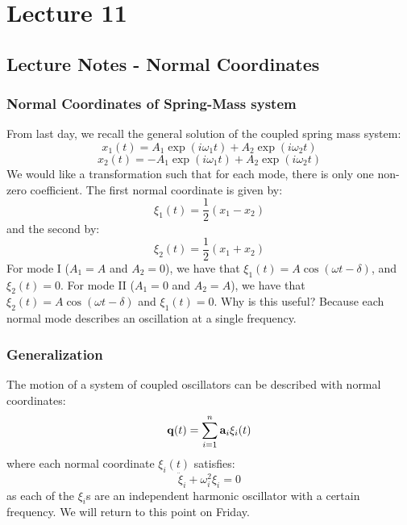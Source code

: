 \section{Lecture 11}
\subsection{Lecture Notes - Normal Coordinates}
\subsubsection{Normal Coordinates of Spring-Mass system}
From last day, we recall the general solution of the coupled spring mass system:
\[x_1(t) = A_1\exp(i\omega_1 t) + A_2\exp(i\omega_2 t)\]
\[x_2(t) = -A_1\exp(i\omega_1 t) + A_2\exp(i \omega_2 t)\]
We would like a transformation such that for each mode, there is only one non-zero coefficient. The first normal coordinate is given by:
\[\xi_1(t) = \frac{1}{2}(x_1 - x_2)\]
and the second by:
\[\xi_2(t) = \frac{1}{2}(x_1 + x_2)\]
For mode I ($A_1 = A$ and $A_2 = 0$), we have that $\xi_1(t) = A\cos(\omega t - \delta)$, and $\xi_2(t) = 0$. For mode II ($A_1 = 0$ and $A_2 = A$), we have that $\xi_2(t) = A\cos(\omega t - \delta)$ and $\xi_1(t) = 0$. Why is this useful? Because each normal mode describes an oscillation at a single frequency.
\subsubsection{Generalization}
The motion of a system of coupled oscillators can be described with normal coordinates:
\[\mathbf{q}(t) = \sum_{i=1}^n\mathbf{a}_i\xi_i(t)\]
where each normal coordinate $\xi_i(t)$ satisfies:
\[\ddot{\xi}_i + \omega_i^2\xi_i = 0\]
as each of the $\xi_i$s are an independent harmonic oscillator with a certain frequency. We will return to this point on Friday.
